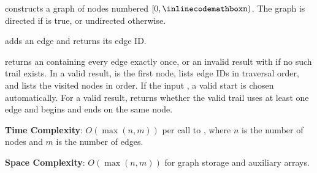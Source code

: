 \begin{compactitem}
  \item {} constructs a graph of  nodes numbered $[0, {\inlinecodemath{n}})$. The graph is directed if  is true, or undirected otherwise.
  \item {} adds an edge and returns its edge ID.
  \item {} returns an  containing every edge exactly once, or an invalid result with  if no such trail exists. In a valid result,  is the first node,  lists edge IDs in traversal order, and  lists the visited nodes in order. If the input , a valid start is chosen automatically. For a valid result,  returns whether the valid trail uses at least one edge and begins and ends on the same node.
\end{compactitem}

\textbf{Time Complexity}: $O(\max\left(n, m\right))$ per call to , where $n$ is the number of nodes and $m$ is the number of edges.

\textbf{Space Complexity}: $O(\max\left(n, m\right))$ for graph storage and auxiliary arrays.

